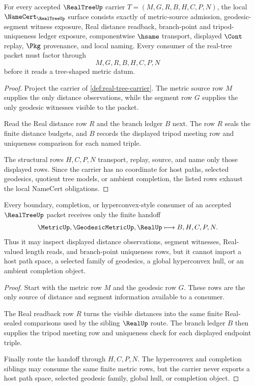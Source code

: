 \begin{theorem}
\label{thm:real-tree-namecert-obligations}
For every accepted $\RealTreeUp$ carrier $T=(M,G,R,B,H,C,P,N)$, the local $\NameCert_{\RealTreeUp}$ surface consists exactly of metric-source admission, geodesic-segment witness exposure, Real distance readback, branch-point and tripod-uniqueness ledger exposure, componentwise $\hsame$ transport, displayed $\Cont$ replay, $\Pkg$ provenance, and local naming. Every consumer of the real-tree packet must factor through
$$
M,G,R,B,H,C,P,N
$$
before it reads a tree-shaped metric datum.
\end{theorem}
\begin{proof}
Project the carrier of \autoref{def:real-tree-carrier}. The metric source row $M$ supplies the only distance observations, while the segment row $G$ supplies the only geodesic witnesses visible to the packet.

Read the Real distance row $R$ and the branch ledger $B$ next. The row $R$ seals the finite distance budgets, and $B$ records the displayed tripod meeting row and uniqueness comparison for each named triple.

The structural rows $H,C,P,N$ transport, replay, source, and name only those displayed rows. Since the carrier has no coordinate for host paths, selected geodesics, quotient tree models, or ambient completion, the listed rows exhaust the local NameCert obligations.
\end{proof}

\begin{theorem}
\label{thm:real-tree-geodesic-tripod-handoff}
Every boundary, completion, or hyperconvex-style consumer of an accepted $\RealTreeUp$ packet receives only the finite handoff
$$
\MetricUp,\GeodesicMetricUp,\RealUp \longmapsto B,H,C,P,N .
$$
Thus it may inspect displayed distance observations, segment witnesses, Real-valued length reads, and branch-point uniqueness rows, but it cannot import a host path space, a selected family of geodesics, a global hyperconvex hull, or an ambient completion object.
\end{theorem}
\begin{proof}
Start with the metric row $M$ and the geodesic row $G$. These rows are the only source of distance and segment information available to a consumer.

The Real readback row $R$ turns the visible distances into the same finite Real-sealed comparisons used by the sibling $\RealUp$ route. The branch ledger $B$ then supplies the tripod meeting row and uniqueness check for each displayed endpoint triple.

Finally route the handoff through $H,C,P,N$. The hyperconvex and completion siblings may consume the same finite metric rows, but the carrier never exports a host path space, selected geodesic family, global hull, or completion object.
\end{proof}

